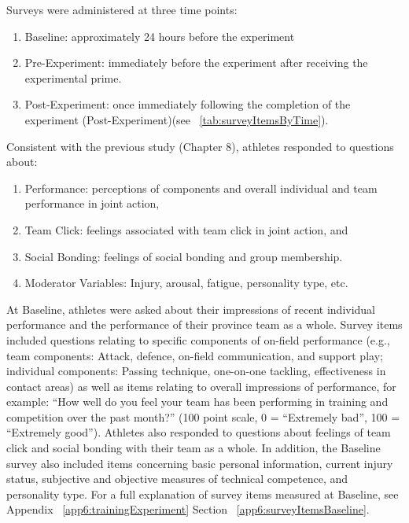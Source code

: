     


Surveys were administered at three time points:

\begin{enumerate}
  \item Baseline: approximately 24 hours before the experiment
  \item Pre-Experiment: immediately before the experiment after receiving the experimental prime.
  \item Post-Experiment: once immediately following the completion of the experiment (Post-Experiment)(see ~\ref{tab:surveyItemsByTime}).
\end{enumerate}

Consistent with the previous study (Chapter 8), athletes responded to questions about:

\begin{enumerate}
  \item Performance: perceptions of components and overall individual and team performance in joint action,
  \item Team Click: feelings associated with team click in joint action, and
  \item Social Bonding: feelings of social bonding and group membership.
  \item Moderator Variables: Injury, arousal, fatigue, personality type, etc.
\end{enumerate}

At Baseline, athletes were asked about their impressions of recent individual performance and the performance of their province team as a whole.  Survey items included questions relating to specific components of on-field performance (e.g., team components: Attack, defence, on-field communication, and support play; individual components: Passing technique, one-on-one tackling, effectiveness in contact areas) as well as items relating to overall impressions of performance, for example: ``How well do you feel your team has been performing in training and competition over the past month?'' (100 point scale, 0 = ``Extremely bad'', 100 = ``Extremely good'').  Athletes also responded to questions about feelings of team click and social bonding with their team as a whole. In addition, the Baseline survey also included items concerning basic personal information, current injury status, subjective and objective measures of technical competence, and personality type.  For a full explanation of survey items measured at Baseline, see Appendix ~\ref{app6:trainingExperiment} Section ~\ref{app6:surveyItemsBaseline}.


